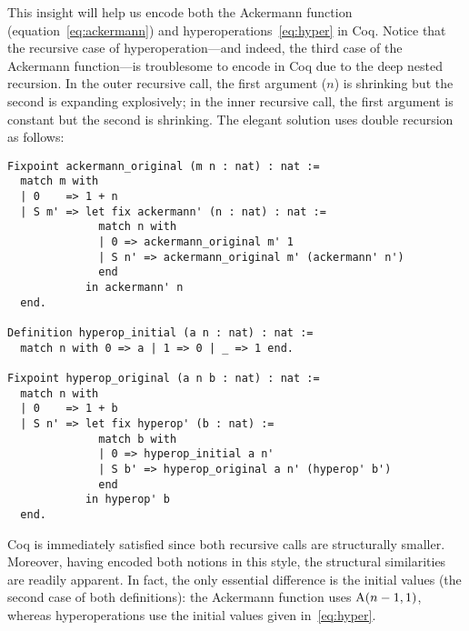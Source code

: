 This insight will help us encode both the Ackermann function (equation~\ref{eq:ackermann}) and hyperoperations~\eqref{eq:hyper} in Coq.  Notice that the recursive case of hyperoperation---and
indeed, the third case of the Ackermann function---is troublesome to encode in Coq due to
the deep nested recursion.  In the outer recursive call, the first argument ($n$) is shrinking 
but the second is expanding explosively; in the inner recursive call, the first argument is 
constant but the second is shrinking. The elegant solution uses double recursion~\cite{someone?} as follows:
\begin{lstlisting}
Fixpoint ackermann_original (m n : nat) : nat :=
  match m with
  | 0    => 1 + n
  | S m' => let fix ackermann' (n : nat) : nat :=
              match n with
              | 0 => ackermann_original m' 1
              | S n' => ackermann_original m' (ackermann' n')
              end
            in ackermann' n
  end.

Definition hyperop_initial (a n : nat) : nat :=
  match n with 0 => a | 1 => 0 | _ => 1 end.

Fixpoint hyperop_original (a n b : nat) : nat :=
  match n with
  | 0    => 1 + b
  | S n' => let fix hyperop' (b : nat) :=
              match b with
              | 0 => hyperop_initial a n'
              | S b' => hyperop_original a n' (hyperop' b')
              end
            in hyperop' b
  end.
\end{lstlisting}
Coq is immediately satisfied since both recursive calls are structurally smaller.
Moreover, having encoded both notions in this style, the structural similarities 
are readily apparent.  In fact, the only essential difference is the initial values 
(the second case of both definitions): the Ackermann function uses $\text{A}(n-1,1)$, whereas
hyperoperations use the initial values given in~\eqref{eq:hyper}.


